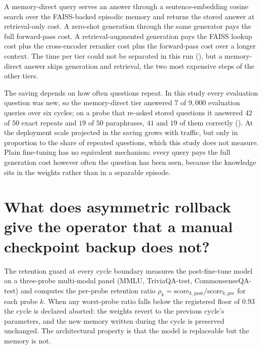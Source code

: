 A memory-direct query serves an answer through a sentence-embedding cosine search over the FAISS-backed episodic memory and returns the stored answer at retrieval-only cost. A zero-shot generation through the same generator pays the full forward-pass cost. A retrieval-augmented generation pays the FAISS lookup cost plus the cross-encoder reranker cost plus the forward-pass cost over a longer context. The time per tier could not be separated in this run (), but a memory-direct answer skips generation and retrieval, the two most expensive steps of the other tiers.

The saving depends on how often questions repeat. In this study every evaluation question was new, so the memory-direct tier answered $7$ of $9{,}000$ evaluation queries over six cycles; on a probe that re-asked stored questions it answered $42$ of $50$ exact repeats and $19$ of $50$ paraphrases, $41$ and $19$ of them correctly (). At the deployment scale projected in  the saving grows with traffic, but only in proportion to the share of repeated questions, which this study does not measure. Plain fine-tuning has no equivalent mechanism: every query pays the full generation cost however often the question has been seen, because the knowledge sits in the weights rather than in a separable episode.


\section[Asymmetric rollback vs manual backup]{What does asymmetric rollback give the operator that a manual checkpoint backup does not?}
\label{app:qa-asymmetric-rollback}

The retention guard at every cycle boundary measures the post-fine-tune model on a three-probe multi-modal panel (MMLU, TriviaQA-test, CommonsenseQA-test) and computes the per-probe retention ratio $\rho_{k} = \mathrm{score}_{k,\text{post}} / \mathrm{score}_{k,\text{pre}}$ for each probe $k$. When any worst-probe ratio falls below the registered floor of $0.93$ the cycle is declared aborted: the weights revert to the previous cycle's parameters, and the new memory written during the cycle is preserved unchanged. The architectural property is that the model is replaceable but the memory is not.

